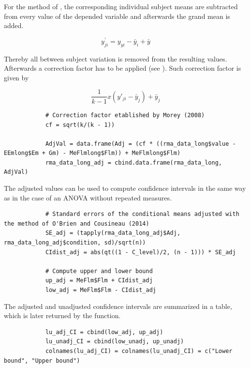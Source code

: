 \documentclass[11pt]{article}
\begin{document}
		For the method of \cite{o2014representing}, the corresponding individual subject means are subtracted from every value of the depended variable and afterwards the grand mean is added.
		
		\begin{equation}
		y^{'}_{ji} = y_{yi} - \bar{y}_i + \bar{y}
		\end{equation}
		
		Thereby all between subject variation is removed from the resulting values. Afterwards a correction
		factor has to be applied (see \citealp{morey2008confidence} ). Such correction factor is given by
		
		\begin{equation}
			\frac{1}{k-1} x (y'_{ji}-\bar{y}_j) + \bar{y}_j
		\end{equation}
		\newline
		\begin{lstlisting}
			# Correction factor etablished by Morey (2008)
			cf = sqrt(k/(k - 1))
			
			AdjVal = data.frame(Adj = (cf * ((rma_data_long$value - EEmlong$Em + Gm) - MeFlmlong$Flm)) + MeFlmlong$Flm)
			rma_data_long_adj = cbind.data.frame(rma_data_long, AdjVal)
		\end{lstlisting}
		
		The adjusted values can be used to compute confidence intervals in the same way as in the case of
		an ANOVA without repeated measures.\\
		
		\begin{lstlisting}
			# Standard errors of the conditional means adjusted with the method of O'Brien and Cousineau (2014)
			SE_adj = (tapply(rma_data_long_adj$Adj, rma_data_long_adj$condition, sd)/sqrt(n))
			CIdist_adj = abs(qt((1 - C_level)/2, (n - 1))) * SE_adj
			
			# Compute upper and lower bound
			up_adj = MeFlm$Flm + CIdist_adj
			low_adj = MeFlm$Flm - CIdist_adj
		\end{lstlisting}
		
		The adjusted and unadjusted confidence intervals are summarized in a table, which is later returned
		by the function.\\
		
		\begin{lstlisting}
			lu_adj_CI = cbind(low_adj, up_adj)
			lu_unadj_CI = cbind(low_unadj, up_unadj)
			colnames(lu_adj_CI) = colnames(lu_unadj_CI) = c("Lower bound", "Upper bound")
		\end{lstlisting}
		
\end{document}
